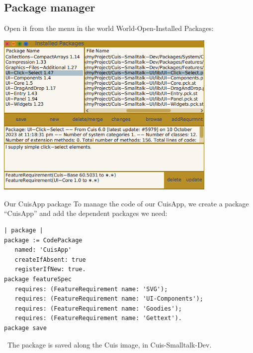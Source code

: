 \documentclass{beamer}
\newcommand{\tip}{\boldmath{\textcolor{red}{$\Rightarrow$}}}
\begin{document}
\subsection{Package manager}
\begin{frame}
  Open it from the menu in the world World-Open-Installed Packages:
  \begin{center}
    \includegraphics[width=0.8\textwidth]{PackageManager.png}    
  \end{center}
\end{frame}
%
\begin{frame}[fragile]{Our CuisApp package}
  To manage the code of our CuisApp, we create a package ``CuisApp''
  and add the dependent packages we need:
\fontsize{10pt}{8pt}\selectfont

\begin{lstlisting}[language=Smalltalk]
| package |
package := CodePackage
   named: 'CuisApp'
   createIfAbsent: true
   registerIfNew: true.
package featureSpec 
   requires: (FeatureRequirement name: 'SVG');
   requires: (FeatureRequirement name: 'UI-Components');
   requires: (FeatureRequirement name: 'Goodies');
   requires: (FeatureRequirement name: 'Gettext').
package save
  \end{lstlisting}

  \tip\ The package is saved along the Cuis image, in
  Cuis-Smalltalk-Dev.
\end{frame}
\end{document}
